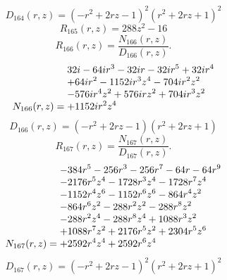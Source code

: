 \documentclass[11pt,a4paper]{article}
\begin{document}
\begin{equation}
D_{164}(r,z)=\left(- r^{2} + 2 r z - 1\right)^{2} \left(r^{2} + 2 r z + 1\right)^{2}
\label{eq:cat-denominator-164}
\end{equation}
\begin{equation}
R_{165}(r,z)=288 z^{2} - 16
\label{eq:cat-rational-165}
\end{equation}
\begin{equation}
R_{166}(r,z)=\frac{N_{166}(r,z)}{D_{166}(r,z)}.
\label{eq:cat-rational-166}
\end{equation}
\begin{equation}
N_{166}(r,z)=\shortstack[l]{$\displaystyle 32 i - 64 i r^{3} - 32 i r - 32 i r^{5} + 32 i r^{4}$\\
$\displaystyle  + 64 i r^{2} - 1152 i r^{3} z^{4} - 704 i r^{2} z^{2}$\\
$\displaystyle  - 576 i r^{4} z^{2} + 576 i r z^{2} + 704 i r^{3} z^{2}$\\
$\displaystyle  + 1152 i r^{2} z^{4}$}
\label{eq:cat-numerator-166}
\end{equation}
\begin{equation}
D_{166}(r,z)=\left(- r^{2} + 2 r z - 1\right) \left(r^{2} + 2 r z + 1\right)
\label{eq:cat-denominator-166}
\end{equation}
\begin{equation}
R_{167}(r,z)=\frac{N_{167}(r,z)}{D_{167}(r,z)}.
\label{eq:cat-rational-167}
\end{equation}
\begin{equation}
N_{167}(r,z)=\shortstack[l]{$\displaystyle  - 384 r^{5} - 256 r^{3} - 256 r^{7} - 64 r - 64 r^{9}$\\
$\displaystyle  - 2176 r^{5} z^{4} - 1728 r^{3} z^{4} - 1728 r^{7} z^{4}$\\
$\displaystyle  - 1152 r^{4} z^{6} - 1152 r^{6} z^{6} - 864 r^{4} z^{2}$\\
$\displaystyle  - 864 r^{6} z^{2} - 288 r^{2} z^{2} - 288 r^{8} z^{2}$\\
$\displaystyle  - 288 r^{2} z^{4} - 288 r^{8} z^{4} + 1088 r^{3} z^{2}$\\
$\displaystyle  + 1088 r^{7} z^{2} + 2176 r^{5} z^{2} + 2304 r^{5} z^{6}$\\
$\displaystyle  + 2592 r^{4} z^{4} + 2592 r^{6} z^{4}$}
\label{eq:cat-numerator-167}
\end{equation}
\begin{equation}
D_{167}(r,z)=\left(- r^{2} + 2 r z - 1\right)^{2} \left(r^{2} + 2 r z + 1\right)^{2}
\label{eq:cat-denominator-167}
\end{equation}
\end{document}
